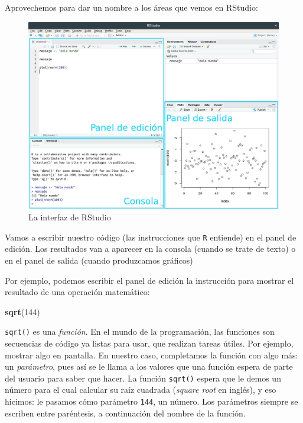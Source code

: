 \documentclass[]{book}
\newenvironment{Shaded}{\begin{snugshade}}{\end{snugshade}}
\newcommand{\KeywordTok}[1]{\textcolor[rgb]{0.13,0.29,0.53}{\textbf{#1}}}
\newcommand{\DecValTok}[1]{\textcolor[rgb]{0.00,0.00,0.81}{#1}}
\newcommand{\NormalTok}[1]{#1}
\begin{document}
Aprovechemos para dar un nombre a los áreas que vemos en RStudio:

\begin{figure}
\includegraphics[width=1\linewidth]{imagenes/Interfaz_RStudio} \caption{La interfaz de RStudio}\label{fig:unnamed-chunk-5}
\end{figure}

Vamos a escribir nuestro código (las instrucciones que \texttt{R}
entiende) en el panel de edición. Los resultados van a aparecer en la
consola (cuando se trate de texto) o en el panel de salida (cuando
produzcamos gráficos)

Por ejemplo, podemos escribir el panel de edición la instrucción para
mostrar el resultado de una operación matemático:

\begin{Shaded}
\begin{Highlighting}[]
\KeywordTok{sqrt}\NormalTok{(}\DecValTok{144}\NormalTok{)}
\end{Highlighting}
\end{Shaded}

\texttt{sqrt()} es una \emph{función}. En el mundo de la programación,
las funciones son secuencias de código ya listas para usar, que realizan
tareas útiles. Por ejemplo, mostrar algo en pantalla. En nuestro caso,
completamos la función con algo más: un \emph{parámetro}, pues así se le
llama a los valores que una función espera de parte del usuario para
saber que hacer. La función \texttt{sqrt()} espera que le demos un
número para el cual calcular su raíz cuadrada (\emph{square root} en
inglés), y eso hicimos: le pasamos cómo parámetro \texttt{144}, un
número. Los parámetros siempre se escriben entre paréntesis, a
continuación del nombre de la función.
\end{document}
